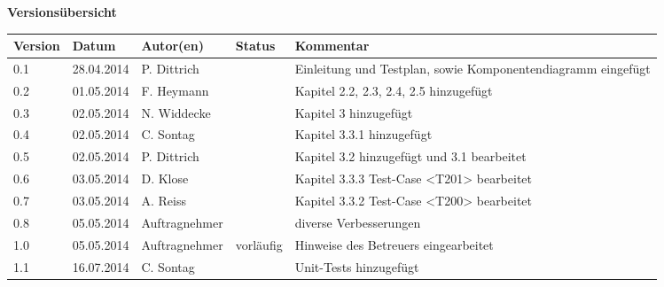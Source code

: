 
{\textbf{Versions\"ubersicht}}\\[2ex]

\begin{longtable}{|m{1.78cm}|m{1.59cm}|m{2.86cm}|m{1.9cm}|m{5.25cm}|}

  \hline                                              %

  \textbf{Version}  &    \textbf{Datum}  &    \textbf{Autor(en)}  &
  \textbf{Status}   &    \textbf{Kommentar}  \\       %
  \hline                                              %

  0.1    &    28.04.2014    &    P. Dittrich    &        &   
  Einleitung und Testplan, sowie Komponentendiagramm eingefügt\\
  \hline                                              %
  0.2    &    01.05.2014    &    F. Heymann    &        &   
  Kapitel 2.2, 2.3, 2.4, 2.5 hinzugefügt\\
  \hline                                              %
  0.3    &    02.05.2014    &    N. Widdecke    &        &   
  Kapitel 3 hinzugefügt\\
  \hline
  0.4    &    02.05.2014    &    C. Sontag    &        &   
  Kapitel 3.3.1 hinzugefügt\\
  \hline  
  0.5    &    02.05.2014    &    P. Dittrich    &        &   
  Kapitel 3.2 hinzugefügt und 3.1 bearbeitet\\
  \hline
  0.6    &    03.05.2014    &    D. Klose    &        &   
  Kapitel 3.3.3 Test-Case <T201> bearbeitet\\
  \hline  
  0.7    &    03.05.2014    &    A. Reiss    &        &   
  Kapitel 3.3.2 Test-Case <T200> bearbeitet\\
  \hline  
  0.8    &    05.05.2014    &    Auftragnehmer    &        &   
  diverse Verbesserungen\\
  \hline
  1.0    &    05.05.2014    &    Auftragnehmer    &    vorläufig    &   
  Hinweise des Betreuers eingearbeitet\\
  \hline 
  1.1    &    16.07.2014    &    C. Sontag    &        &   
  Unit-Tests hinzugefügt\\
  \hline 
\end{longtable}


